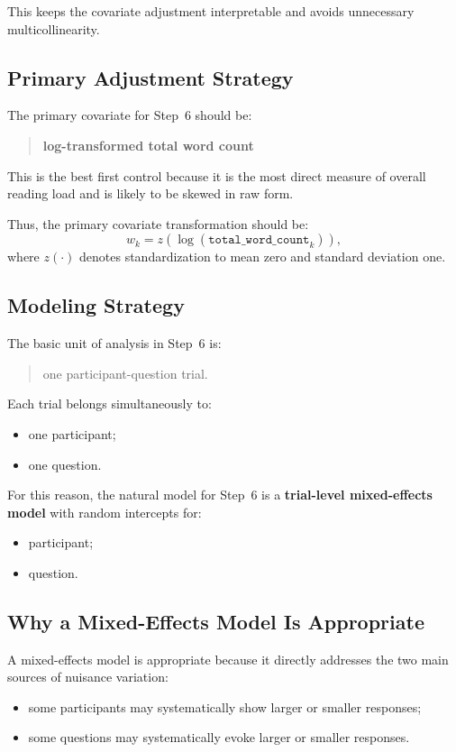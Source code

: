 \documentclass[11pt]{article}
\begin{document}
This keeps the covariate adjustment interpretable and avoids unnecessary multicollinearity.

\subsection{Primary Adjustment Strategy}
The primary covariate for Step~6 should be:
\begin{quote}
\textbf{log-transformed total word count}
\end{quote}

This is the best first control because it is the most direct measure of overall reading load and
is likely to be skewed in raw form.

Thus, the primary covariate transformation should be:
\begin{equation}
w_k = z\!\left(\log(\texttt{total\_word\_count}_k)\right),
\end{equation}
where \(z(\cdot)\) denotes standardization to mean zero and standard deviation one.

\subsection{Modeling Strategy}
The basic unit of analysis in Step~6 is:
\begin{quote}
one participant-question trial.
\end{quote}

Each trial belongs simultaneously to:
\begin{itemize}
    \item one participant;
    \item one question.
\end{itemize}

For this reason, the natural model for Step~6 is a \textbf{trial-level mixed-effects model}
with random intercepts for:
\begin{itemize}
    \item participant;
    \item question.
\end{itemize}

\subsection{Why a Mixed-Effects Model Is Appropriate}
A mixed-effects model is appropriate because it directly addresses the two main sources of nuisance variation:
\begin{itemize}
    \item some participants may systematically show larger or smaller responses;
    \item some questions may systematically evoke larger or smaller responses.
\end{itemize}
\end{document}
